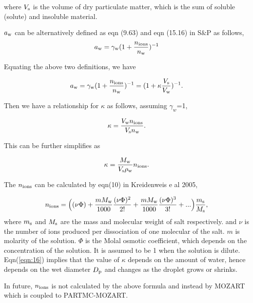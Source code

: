 \documentclass[12pt]{article}
\begin{document}
where $V_{\rm s}$ is the volume of dry particulate matter, which is the sum of soluble (solute) and insoluble material.

$a_{\rm w}$ can be alternatively defined as eqn (9.63) and eqn (15.16) in S$\&$P as follows, 
\begin{equation}\label{eqn:12}
a_{\rm w}=\gamma_{\rm w}(1+\frac{n_{\rm ions}}{n_{\rm w}})^{-1}
\end{equation}

Equating the above two definitions, we have

\begin{equation}\label{eqn:13}
a_{\rm w}=\gamma_{\rm w}(1+\frac{n_{\rm ions}}{n_{\rm w}})^{-1}=(1+\kappa \frac{V_{\rm s}}{V_{\rm w}})^{-1}.
\end{equation}

Then we have a relationship for $\kappa$ as follows, assuming $\gamma_{w}$=1, 

\begin{equation}\label{eqn:14}
\kappa= \frac{V_{\rm w} n_{\rm ions}}{V_{\rm s} n_{\rm w}}.
\end{equation}

This can be further simplifies as 

\begin{equation}\label{eqn:15}
\kappa= \frac{M_{\rm w}}{V_{\rm s} \rho_{\rm w}}n_{\rm ions}.
\end{equation}

The $n_{\rm ions}$ can be  calculated by eqn(10) in Kreidenweis e al 2005, 

\begin{equation}\label{eqn:16}
n_{\rm ions}=\Big((\nu \Phi) + \frac{m M_{\rm w}}{1000} \frac{(\nu \Phi)^{2}}{2!} + \frac{m M_{\rm w}}{1000} \frac{(\nu \Phi)^{3}}{3!}+... \Big) \frac{m_{\rm s}}{M_{\rm s}},
\end{equation}
where $m_{\rm s}$ and $M_{\rm s}$ are the mass and molecular weight of salt respectively. and $\nu$ is the number of ions produced per dissociation of one molecular of the salt. $m$ is molarity of the solution. $\Phi$ is the Molal osmotic coefficient, which depends on the concentration of the solution. It is assumed to be 1 when the solution is dilute. Eqn(\ref{eqn:16}) implies that the value of $\kappa$ depends on the amount of water, hence depends on the wet diameter $D_{\rm p}$ and changes as the droplet grows or shrinks.

In future, $n_{\rm ions}$ is not calculated by the above formula and instead by MOZART which is coupled to PARTMC-MOZART.
\end{document}
